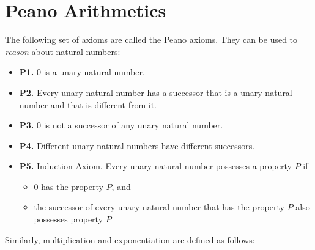 \section{Peano Arithmetics}


\begin{excursion}{}
The following set of axioms are called the Peano axioms. They can be used to \textit{reason} about natural numbers:
\begin{itemize}
    \item \textbf{P1.} $0$ is a unary natural number.
    \item \textbf{P2.} Every unary natural number has a successor that is a unary natural number and that is different from it.
    \item \textbf{P3.} $0$ is not a successor of any unary natural number.
    \item \textbf{P4.} Different unary natural numbers have different successors.
    \item \textbf{P5.} Induction Axiom. Every unary natural number possesses a property $P$ if
    \begin{itemize}
        \item $0$ has the property $P$, and
        \item the successor of every 
        unary natural number that has the property $P$ also possesses property $P$
    \end{itemize}
\end{itemize}
\end{excursion}

\begin{excursion}{}

Similarly, multiplication and exponentiation are defined as follows:

\end{excursion}

